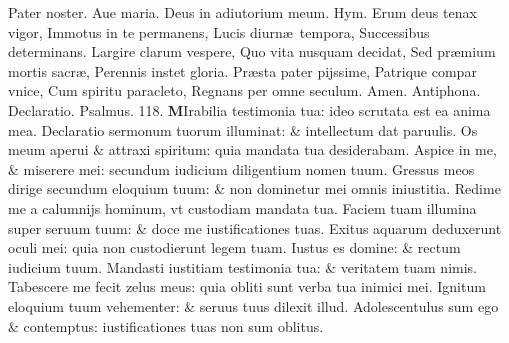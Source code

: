 \documentclass[a5paper,10pt]{book}
\def\ae{æ}
\begin{document}
\begin{multicols*}{2}
\vspace{-1em}
\par \noindent Pater noster. Aue maria. Deus in adiutorium meum. \color{red} \hypertarget{Rerumdeus}{Hym.} \color{black}
Erum deus tenax vigor, Immotus in te permanens, Lucis diurn\ae \ tempora, Successibus determinans.
\newline \color{red} L\color{black}argire clarum vespere, Quo vita nusquam decidat, Sed pr\ae mium mortis sacr\ae , Perennis instet gloria.
\newline \color{red} P\color{black}r\ae sta pater pijssime, Patrique compar vnice, Cum spiritu paracleto, Regnans per omne seculum. Amen.
\newline \color{red} Antiphona. \color{black} Declaratio. \color{red} Psalmus. \hypertarget{ps118.9}{118.} \color{black}
\vspace{-1.25em}
\lettrine[lines=2]{\bfseries M}{}Irabilia testimonia tua: ideo scrutata est ea anima mea.
\newline \color{red} D\color{black}eclaratio sermonum tuorum illuminat: \& intellectum dat paruulis.
\newline \color{red} O\color{black}s meum aperui \& attraxi spiritum: quia mandata tua desiderabam.
\newline \color{red} A\color{black}spice in me, \& miserere mei: secundum iudicium diligentium nomen tuum.
\newline \color{red} G\color{black}ressus meos dirige secundum eloquium tuum: \& non dominetur mei omnis iniustitia.
\newline \color{red} R\color{black}edime me a calumnijs hominum, vt custodiam mandata tua.
\newline \color{red} F\color{black}aciem tuam illumina super seruum tuum: \& doce me iustificationes tuas.
\newline \color{red} E\color{black}xitus aquarum deduxerunt oculi mei: quia non custodierunt legem tuam.
\newline \color{red} I\color{black}ustus es domine: \& rectum iudicium tuum.
\newline \color{red} M\color{black}andasti iustitiam testimonia tua: \& veritatem tuam nimis.
\newline \color{red} T\color{black}abescere me fecit zelus meus: quia obliti sunt verba tua inimici mei.
\newline \color{red} I\color{black}gnitum eloquium tuum vehementer: \& seruus tuus dilexit illud.
\newline \color{red} A\color{black}dolescentulus sum ego \& contemptus: iustificationes tuas non sum oblitus.

\end{multicols*}
\end{document}
